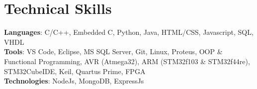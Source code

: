 \documentclass[letterpaper,11pt]{article}
\begin{document}
\section{Technical Skills}
 \begin{itemize}[leftmargin=0.15in, label={}]
    \small{\item{
     \textbf{Languages}{: C/C++, Embedded C, Python, Java, HTML/CSS, Javascript, SQL, VHDL} \\
     \textbf{Tools}{: VS Code, Eclipse, MS SQL Server, Git, Linux, Proteus, OOP \& Functional Programming, AVR (Atmega32), ARM (STM32f103 \& STM32f44re), STM32CubeIDE, Keil, Quartus Prime, FPGA} \\
     \textbf{Technologies}{: NodeJs, MongoDB, ExpressJs}
  
    }}
 \end{itemize}
\end{document}
